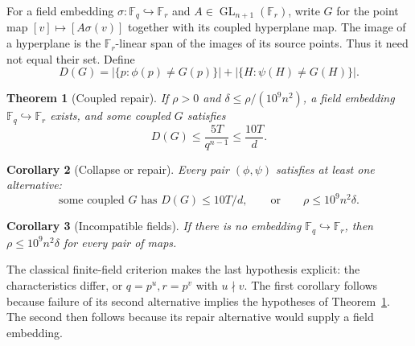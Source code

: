 \documentclass[11pt]{article}
\newtheorem{theorem}{Theorem}
\newtheorem{corollary}[theorem]{Corollary}
\newcommand{\F}{\mathbb F}
\begin{document}
For a field embedding $\sigma:\F_q\hookrightarrow\F_r$ and
$A\in\operatorname{GL}_{n+1}(\F_r)$, write $G$ for the point map
$[v]\mapsto[A\sigma(v)]$ together with its coupled hyperplane map. The
image of a hyperplane is the $\F_r$-linear span of the images of its
source points. Thus it need not equal their set. Define
\[
 D(G)=|\{p:\phi(p)\ne G(p)\}|+
       |\{H:\psi(H)\ne G(H)\}|.
\]
\begin{theorem}[Coupled repair]\label{main}
If $\rho>0$ and $\delta\leq\rho/(10^9n^2)$, a field embedding
$\F_q\hookrightarrow\F_r$ exists, and some coupled $G$ satisfies
\begin{equation}\label{bound}
 D(G)\leq\frac{5T}{q^{n-1}}\leq\frac{10T}{d}.
\end{equation}
\end{theorem}
\begin{corollary}[Collapse or repair]\label{dichotomy}
Every pair $(\phi,\psi)$ satisfies at least one alternative:
\[
 \text{some coupled }G\text{ has }D(G)\leq10T/d,
 \qquad\text{or}\qquad \rho\leq10^9n^2\delta.
\]
\end{corollary}
\begin{corollary}[Incompatible fields]\label{fields}
If there is no embedding $\F_q\hookrightarrow\F_r$, then
$\rho\leq10^9n^2\delta$ for every pair of maps.
\end{corollary}
The classical finite-field criterion makes the last hypothesis explicit:
the characteristics differ, or $q=p^u,r=p^v$ with $u\nmid v$.
The first corollary follows because failure of its second alternative
implies the hypotheses of Theorem~\ref{main}. The second then follows
because its repair alternative would supply a field embedding.
\end{document}
